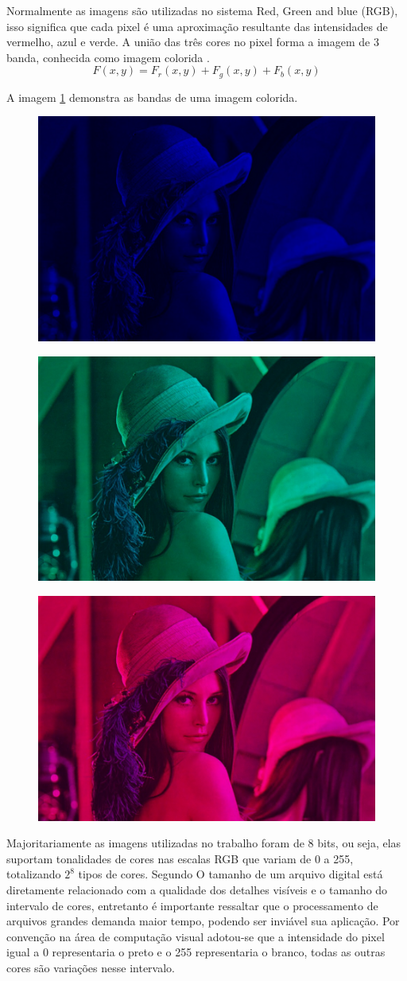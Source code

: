 \documentclass[12pt]{article}
\begin{document}
	Normalmente as imagens são utilizadas no sistema Red, Green and blue (RGB), isso significa que cada pixel é uma aproximação resultante das intensidades de vermelho, azul e verde. A união das três cores no pixel forma a imagem de 3 banda, conhecida como imagem colorida \citep{biasi2002desenvolvimento}.
	\begin{equation}
	F(x,y)=F_r(x,y)+F_g(x,y)+F_b(x,y)
	\end{equation}
	
	A imagem \ref{fig:blue} demonstra as bandas de uma imagem colorida.
	

\begin{figure}[h!]
	\centering
	\includegraphics[width=0.4\linewidth]{img/Blue}
	\caption{}
	\label{fig:blue}
\end{figure}
\begin{figure}[h!]
	\centering
	\includegraphics[width=0.4\linewidth]{img/gree}
	\caption{}
	\label{fig:gree}
\end{figure}
\begin{figure}[h!]
	\centering
	\includegraphics[width=0.4\linewidth]{img/Red}
	\caption{}
	\label{fig:red}
\end{figure}
	
	Majoritariamente as imagens utilizadas no trabalho foram de 8 bits, ou seja, elas suportam tonalidades de cores nas escalas RGB que variam de 0 a 255, totalizando $2^8$ tipos de cores. Segundo \cite{morgan2008tecnicas} O tamanho de um arquivo digital está diretamente relacionado com a qualidade dos detalhes visíveis e o tamanho do intervalo de cores, entretanto é importante ressaltar que o processamento de arquivos grandes demanda maior tempo, podendo ser inviável sua aplicação. Por convenção na área de computação visual adotou-se que a intensidade do pixel igual a 0 representaria o preto e o 255 representaria o branco, todas as outras cores são variações nesse intervalo. 
	
\end{document}

